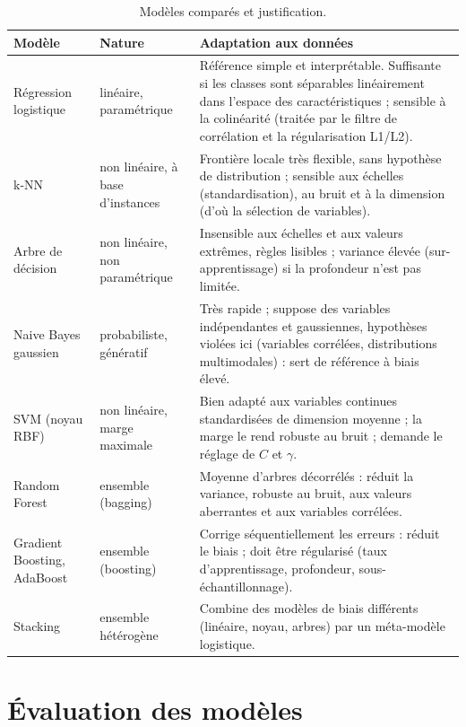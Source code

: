 \documentclass[11pt,a4paper]{article}
\begin{document}
\begin{table}[H]\centering\small
\caption{Modèles comparés et justification.}\label{tab:justif}
\begin{tabularx}{\linewidth}{>{\raggedright}p{2.6cm}>{\raggedright}p{2.6cm}X}
\toprule
Modèle & Nature & Adaptation aux données\\
\midrule
Régression logistique & linéaire, paramétrique & Référence simple et interprétable. Suffisante si les classes sont séparables linéairement dans l'espace des caractéristiques ; sensible à la colinéarité (traitée par le filtre de corrélation et la régularisation L1/L2).\\
k-NN & non linéaire, à base d'instances & Frontière locale très flexible, sans hypothèse de distribution ; sensible aux échelles (standardisation), au bruit et à la dimension (d'où la sélection de variables).\\
Arbre de décision & non linéaire, non paramétrique & Insensible aux échelles et aux valeurs extrêmes, règles lisibles ; variance élevée (sur-apprentissage) si la profondeur n'est pas limitée.\\
Naive Bayes gaussien & probabiliste, génératif & Très rapide ; suppose des variables indépendantes et gaussiennes, hypothèses violées ici (variables corrélées, distributions multimodales) : sert de référence à biais élevé.\\
SVM (noyau RBF) & non linéaire, marge maximale & Bien adapté aux variables continues standardisées de dimension moyenne ; la marge le rend robuste au bruit ; demande le réglage de $C$ et $\gamma$.\\
Random Forest & ensemble (bagging) & Moyenne d'arbres décorrélés : réduit la variance, robuste au bruit, aux valeurs aberrantes et aux variables corrélées.\\
Gradient Boosting, AdaBoost & ensemble (boosting) & Corrige séquentiellement les erreurs : réduit le biais ; doit être régularisé (taux d'apprentissage, profondeur, sous-échantillonnage).\\
Stacking & ensemble hétérogène & Combine des modèles de biais différents (linéaire, noyau, arbres) par un méta-modèle logistique.\\
\bottomrule
\end{tabularx}
\end{table}

\section{Évaluation des modèles}
\end{document}
